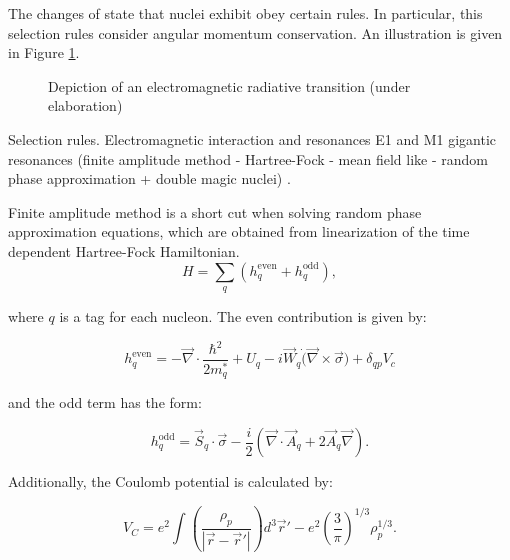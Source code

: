 \documentclass[openany]{book}
\begin{document}
The changes of state that nuclei exhibit obey certain rules. In particular, this selection rules consider angular momentum conservation. An illustration is given in Figure \ref{fig:radiativeEMTransition}. \\

\begin{figure}[H]
	
	\caption[Radiative transition illustration]{Depiction of an electromagnetic radiative transition (under elaboration)}
	\label{fig:radiativeEMTransition}
\end{figure}

Selection rules. Electromagnetic interaction and resonances E1 and M1 gigantic resonances (finite amplitude method - Hartree-Fock - mean field like - random phase approximation + double magic nuclei) \cite{sasaki_kawano_stetcu_2022}.

Finite amplitude method is a short cut when solving random phase approximation equations, which are obtained from linearization of the time dependent Hartree-Fock Hamiltonian. \\

\begin{equation}\label{eq:micro_RPA_singleHamiltonian}
	H = \sum_{q} (h^{\mathrm{even}}_q + h^{\mathrm{odd}}_q),
\end{equation}

where $q$ is a tag for each nucleon. The even contribution is given by:

\begin{equation}\label{eq:micro_RPA_singleHamiltonian_even}
	h^{\mathrm{even}}_q = - \vec \nabla \cdot \frac{\hbar^2}{2m^{*}_q} + U_q - i \vec W_q \dot (\vec \nabla \times \vec \sigma) + \delta_{qp} V_c
\end{equation} 

and the odd term has the form:

\begin{equation}\label{eq:micro_RPA_singleHamiltonian_odd}
	h^{\mathrm{odd}}_q = \vec S_q \cdot \vec \sigma - \frac{i}{2} (\vec \nabla \cdot \vec A_q + 2 \vec A_q \vec \nabla).
\end{equation} 

Additionally, the Coulomb potential is calculated by: 

\begin{equation}\label{eq:micro_RPA_coulomb}
	V_{C} = e^2 \int { \left( \frac{\rho_p}{|\vec r - \vec r'|} \right) d^3\vec r' } - e^2 \left(\frac{3}{\pi}\right)^{1/3}\rho^{1/3}_p.
\end{equation} 
\end{document}
